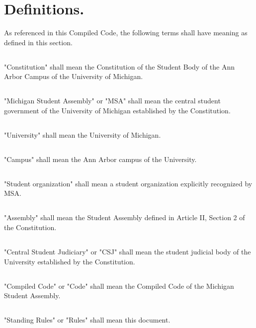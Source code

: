 \documentclass{rules}
\begin{document}
\section{Definitions.}
As referenced in this Compiled Code, the following terms shall have meaning as defined in this section.
\subsection{}
"Constitution" shall mean the Constitution of the Student Body of the Ann Arbor Campus of the University of Michigan.
\subsection{}
"Michigan Student Assembly" or "MSA" shall mean the central student government of the University of Michigan established by the Constitution.
\subsection{}
"University" shall mean the University of Michigan.
\subsection{}
"Campus" shall mean the Ann Arbor campus of the University.
\subsection{}
"Student organization" shall mean a student organization explicitly recognized by MSA.
\subsection{}
"Assembly" shall mean the Student Assembly defined in Article II, Section 2 of the Constitution.
\subsection{}
"Central Student Judiciary" or "CSJ" shall mean the student judicial body of the University established by the Constitution.
\subsection{}
"Compiled Code" or "Code" shall mean the Compiled Code of the Michigan Student Assembly.
\subsection{}
"Standing Rules" or "Rules" shall mean this document.
\end{document}
